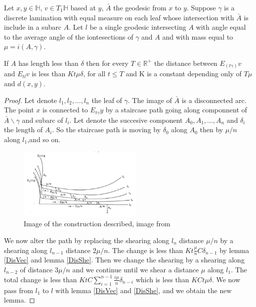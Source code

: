 \begin{lem}
Let $x,y \in \mathbb{H}$, $v\in T_1 \mathbb{H}$ based at $y$, $\bar{A}$ the geodesic from $x$ to $y$. Suppose $\gamma$ is a discrete lamination with equal measure on each leaf whose intersection with $\bar{A}$ is include in a subarc $A$. Let $l$ be a single geodesic intersecting $A$ with angle equal to the average angle of the iontesections of $\gamma$ and $A$ and with mass equal to $\mu=i(A,\gamma)$.

If $A$ has length less than $\delta$ then for every $T\in \mathbb{R}^+$ the distance between $E_(t\gamma)v$ and $E_{t l}v$ is less than $Kt \mu \delta$, for all $t \leq T$ and K is a constant depending only of $T \mu$ and $d(x,y)$.
\end{lem}

\begin{proof}
Let denote $l_1,l_2,...,l_n$ the leaf of $\gamma$. The image of $\bar{A}$ is a disconnected arc. The point $x$ is connected to $E_{t \gamma}y$ by a staircase path going along componnent of $\bar{A} \backslash \gamma$ and subarc of $l_i$. Let denote the succesive component $A_0,A_1,...,A_n$ and $\delta_i$ the length of $A_i$. So the staircase path is moving by $\delta_0$ along $A_0$ then by $\mu / n$ along $l_1$,and so on.

\begin{figure}[h!]
\centering
\includegraphics[width=6cm]{Image/ProofEarthquake.jpg}
\caption{Image of the construction described, image from \cite{NielsenRealizationPro}}
\end{figure}

We now alter the path by replacing the shearing along $l_n$ distance $\mu / n$ by a shearing along $l_{n-1}$ distance $2 \mu /n$. The change is less than $Kt \frac{\mu}{n}C \delta_{n-1}$ by lemma \ref{DisVec} and lemma \ref{DisShe}. Then we change the shearing by a shearing along $l_{n-2}$ of distance $3 \mu /n$ and we continue until we shear a distance $\mu$ along $l_1$. The total change is less than $KtC\sum_{i=1}^{n-1}\frac{i \mu}{n} \delta_{n-i}$
 which is less than $KCt \mu \delta$.
 We now pass from $l_1$ to $l$ with lemma \ref{DisVec} and \ref{DisShe}, and we obtain the new lemma.
\end{proof}

